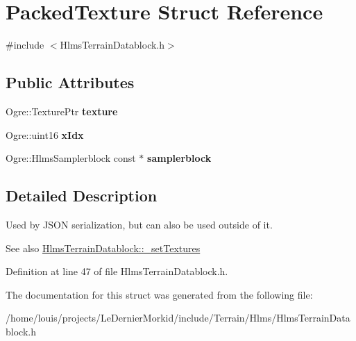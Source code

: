 \hypertarget{struct_packed_texture}{}\section{Packed\+Texture Struct Reference}
\label{struct_packed_texture}


{\ttfamily \#include $<$Hlms\+Terrain\+Datablock.\+h$>$}

\subsection*{Public Attributes}
\begin{DoxyCompactItemize}
\item 
\mbox{\label{struct_packed_texture_a95a48d6bd56b3fbefb6897a07dfbac13}} 
Ogre\+::\+Texture\+Ptr {\bfseries texture}
\item 
\mbox{\label{struct_packed_texture_ab79a459476c98fe4455bba13a106dcb1}} 
Ogre\+::uint16 {\bfseries x\+Idx}
\item 
\mbox{\label{struct_packed_texture_a3d790f2867b0a8ac166dbba8860c628d}} 
Ogre\+::\+Hlms\+Samplerblock const  $\ast$ {\bfseries samplerblock}
\end{DoxyCompactItemize}


\subsection{Detailed Description}
Used by J\+S\+ON serialization, but can also be used outside of it. \begin{DoxySeeAlso}{See also}
\hyperlink{class_hlms_terrain_datablock_a9491ff27ef7052bcce3edb825acc61fe}{Hlms\+Terrain\+Datablock\+::\+\_\+set\+Textures} 
\end{DoxySeeAlso}


Definition at line 47 of file Hlms\+Terrain\+Datablock.\+h.



The documentation for this struct was generated from the following file\+:\begin{DoxyCompactItemize}
\item 
/home/louis/projects/\+Le\+Dernier\+Morkid/include/\+Terrain/\+Hlms/Hlms\+Terrain\+Datablock.\+h\end{DoxyCompactItemize}
